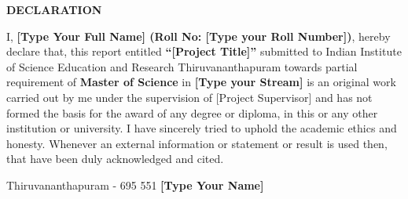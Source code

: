  \setcounter{page}{2}
\begin{center}
{\Large{\bf{DECLARATION}}}
\end{center}

\noindent

I, \textbf{[Type Your Full Name] (Roll No: [Type your Roll Number])}, hereby declare that, this report entitled \textbf{``[Project Title]”} submitted to Indian Institute of Science Education and Research Thiruvananthapuram towards partial requirement of \textbf{Master of Science} in \textbf{[Type your Stream]} is an original work carried out by me under the supervision of [Project Supervisor] and has not formed the basis for the award of any degree or diploma, in this or any other institution or university. I have sincerely tried to uphold the academic ethics and honesty. Whenever an external information or statement or result is used then, that have been duly acknowledged and cited.

\vspace{4cm} %

\noindent Thiruvananthapuram - 695 551 \hfill \textbf{[Type Your Name]}

 \hfill

\clearpage
